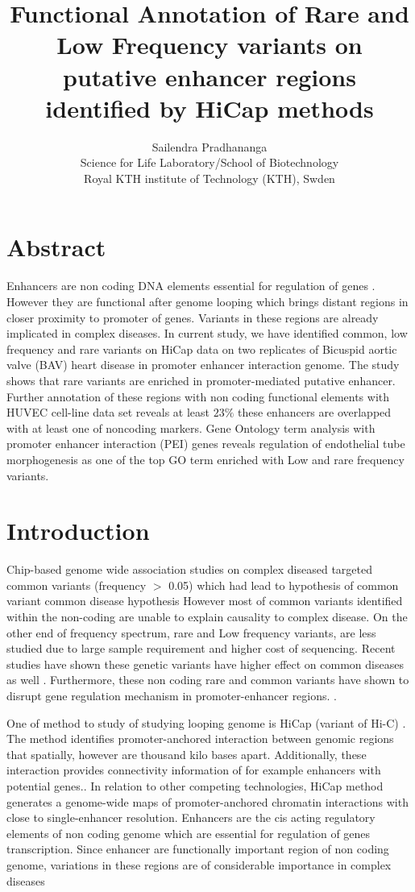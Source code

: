 \documentclass[10pt]{article} %
\title{Functional Annotation of Rare and Low Frequency variants on putative enhancer regions identified by HiCap methods}
\author{Sailendra Pradhananga\\
Science for Life Laboratory/School of Biotechnology\\
Royal KTH institute of Technology (KTH), Swden}
\date{} %
\begin{document}
\maketitle


\section*{Abstract}

Enhancers are non coding DNA elements essential for regulation of genes \cite{shlyueva2014transcriptional}. However they are functional after genome looping which brings distant regions in closer proximity to promoter of genes. Variants in these regions are already implicated in complex diseases. In current study, we have identified common, low frequency and rare variants on HiCap data on two replicates of Bicuspid aortic valve (BAV) heart disease in promoter enhancer interaction genome. The study shows that rare variants are enriched in promoter-mediated putative enhancer. Further annotation of these regions with non coding functional elements with HUVEC cell-line  data set reveals at least  $23\%$ these enhancers are overlapped with at least one of noncoding markers. Gene Ontology term analysis  with promoter enhancer interaction (PEI) genes reveals regulation of endothelial tube morphogenesis as one of the top GO term enriched with Low and rare frequency variants.

\section{Introduction}
Chip-based genome wide association studies  on complex diseased targeted common variants (frequency $>$ 0.05) which had lead to hypothesis of common variant common disease hypothesis \cite{cirulli2010uncovering} However most of common variants identified within the non-coding are unable to explain causality to complex  disease. On the other end of frequency spectrum, rare and Low frequency  variants, are less studied due to large sample requirement and higher cost of sequencing. Recent studies have shown these genetic variants have higher effect on common diseases as well \cite{cirulli2010uncovering, bomba2017impact, saint}. Furthermore, these  non coding  rare and common variants  have shown to disrupt gene regulation mechanism  in promoter-enhancer regions.\cite{chatterjee2016enhancer, rusu2017type} .

One of method to study of studying looping genome is HiCap (variant of Hi-C) \cite{sahlen2015}. The method identifies promoter-anchored interaction between genomic regions that spatially, however are thousand kilo bases apart. Additionally, these interaction provides connectivity information of for example enhancers with potential genes.. In relation  to other competing technologies, HiCap method generates a genome-wide maps of promoter-anchored chromatin interactions with close to single-enhancer resolution.  Enhancers are the cis acting regulatory elements of non coding genome which are essential for regulation of genes transcription. Since enhancer are functionally important region of non coding genome, variations in these regions are of considerable importance in complex diseases  \cite{krijger2016regulation,zhang2015non}
\end{document}
